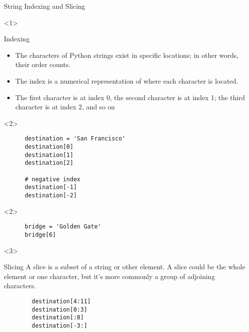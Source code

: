 \documentclass[../main.tex]{subfiles}
\begin{document}
\begin{frame}[fragile]{String Indexing and Slicing}
  \begin{onlyenv}<1>
    \begin{block}{Indexing} \justifying
    \begin{itemize} \justifying
    \item The characters of Python strings exist in specific locations; in other words, their order counts. 
    \item The index is a numerical representation of where each character is located. 
    \item The first \alert{character is at index 0}, the second character is at index 1; the third character is at index 2, and so on
    \end{itemize}
  \end{block}
  \end{onlyenv}

  \begin{onlyenv}<2>
      \begin{code}{}
    \begin{lstlisting}
      destination = 'San Francisco'
      destination[0]
      destination[1]
      destination[2]

      # negative index
      destination[-1]
      destination[-2]
    \end{lstlisting}
  \end{code}
\end{onlyenv}

\begin{onlyenv}<2>
  \begin{code}{}
    \begin{lstlisting}
      bridge = 'Golden Gate'
      bridge[6]
    \end{lstlisting}
  \end{code}
\end{onlyenv}

\begin{onlyenv}<3>
  \begin{block}{Slicing} \justifying
    A slice is \alert{a subset of a string or other element}. A slice could be the whole element or one character, but it's more commonly a group of adjoining characters.

    \begin{code}{}
      \begin{lstlisting}
        destination[4:11]
        destination[0:3]
        destination[:8]
        destination[-3:]
      \end{lstlisting}
    \end{code}
  \end{block}
\end{onlyenv}
\end{frame}
\end{document}
